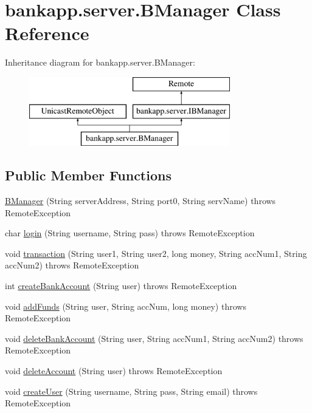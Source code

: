 \hypertarget{classbankapp_1_1server_1_1_b_manager}{}\section{bankapp.\+server.\+B\+Manager Class Reference}
\label{classbankapp_1_1server_1_1_b_manager}
Inheritance diagram for bankapp.\+server.\+B\+Manager\+:\begin{figure}[H]
\begin{center}
\leavevmode
\includegraphics[height=3.000000cm]{classbankapp_1_1server_1_1_b_manager}
\end{center}
\end{figure}
\subsection*{Public Member Functions}
\begin{DoxyCompactItemize}
\item 
\hyperlink{classbankapp_1_1server_1_1_b_manager_aa7f45d3eddae4e91afaf2b19275b0c7e}{B\+Manager} (String server\+Address, String port0, String serv\+Name)  throws Remote\+Exception 
\item 
char \hyperlink{classbankapp_1_1server_1_1_b_manager_a3840891c318887cef8ed2f7c193cfba9}{login} (String username, String pass)  throws Remote\+Exception 
\item 
void \hyperlink{classbankapp_1_1server_1_1_b_manager_a5ce24fa69bd4bd08ef793072495b84b4}{transaction} (String user1, String user2, long money, String acc\+Num1, String acc\+Num2)  throws Remote\+Exception 
\item 
int \hyperlink{classbankapp_1_1server_1_1_b_manager_abf7716d220d573ad491f4ee15312aaff}{create\+Bank\+Account} (String user)  throws Remote\+Exception 
\item 
void \hyperlink{classbankapp_1_1server_1_1_b_manager_a0c81d9fb02961e95efa371249f284b47}{add\+Funds} (String user, String acc\+Num, long money)  throws Remote\+Exception 
\item 
void \hyperlink{classbankapp_1_1server_1_1_b_manager_a56404dc8a349618d517f73ad4f8e0026}{delete\+Bank\+Account} (String user, String acc\+Num1, String acc\+Num2)  throws Remote\+Exception 
\item 
void \hyperlink{classbankapp_1_1server_1_1_b_manager_ad8c5c164841d3ad7e25070c6b065bb4d}{delete\+Account} (String user)  throws Remote\+Exception 
\item 
void \hyperlink{classbankapp_1_1server_1_1_b_manager_ad98f4af0b4ae0842a58570e6c08a371c}{create\+User} (String username, String pass, String email)  throws Remote\+Exception 
\end{DoxyCompactItemize}


